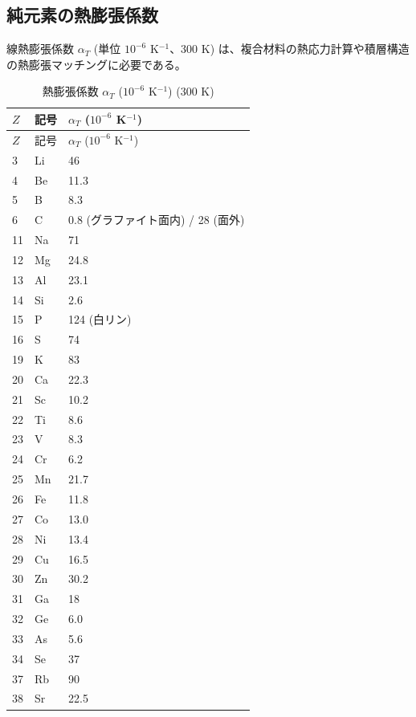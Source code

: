\documentclass[11pt,a4paper]{article}
\theoremstyle{remark}
\begin{document}
	\subsection{純元素の熱膨張係数}
	\label{subsec:thermal-expansion}
	
	線熱膨張係数 \(\alpha_T\) (単位 \(10^{-6}\) K\(^{-1}\)、300 K) は、複合材料の熱応力計算や積層構造の熱膨張マッチングに必要である。
	
	\begin{longtable}{p{0.6cm}p{1.2cm}p{1.5cm}}
		\caption{熱膨張係数 \(\alpha_T\) (\(10^{-6}\) K\(^{-1}\)) (300 K)} \label{tab:thermal-expansion-all} \\
		\toprule
		\(Z\) & 記号 & \(\alpha_T\) (\(10^{-6}\) K\(^{-1}\)) \\
		\midrule
		\endfirsthead
		\toprule
		\(Z\) & 記号 & \(\alpha_T\) (\(10^{-6}\) K\(^{-1}\)) \\
		\midrule
		\endhead
		3  & Li & 46 \\
		4  & Be & 11.3 \\
		5  & B  & 8.3 \\
		6  & C  & 0.8 (グラファイト面内) / 28 (面外) \\
		11 & Na & 71 \\
		12 & Mg & 24.8 \\
		13 & Al & 23.1 \\
		14 & Si & 2.6 \\
		15 & P  & 124 (白リン) \\
		16 & S  & 74 \\
		19 & K  & 83 \\
		20 & Ca & 22.3 \\
		21 & Sc & 10.2 \\
		22 & Ti & 8.6 \\
		23 & V  & 8.3 \\
		24 & Cr & 6.2 \\
		25 & Mn & 21.7 \\
		26 & Fe & 11.8 \\
		27 & Co & 13.0 \\
		28 & Ni & 13.4 \\
		29 & Cu & 16.5 \\
		30 & Zn & 30.2 \\
		31 & Ga & 18 \\
		32 & Ge & 6.0 \\
		33 & As & 5.6 \\
		34 & Se & 37 \\
		37 & Rb & 90 \\
		38 & Sr & 22.5 \\

\end{longtable}
\end{document}
